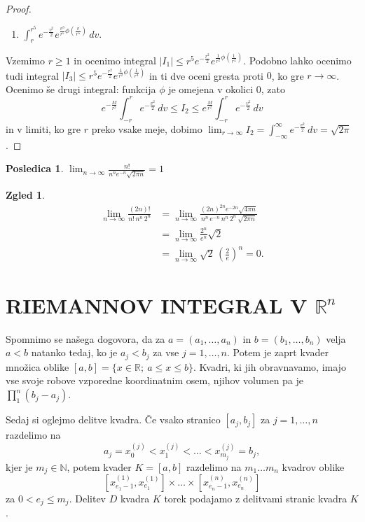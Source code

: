 \documentclass[10pt, a4paper]{article}
\newtheorem{posledica}[izr]{Posledica}
\newtheorem{zgled}{Zgled}[section]
\newenvironment{noticeC}{%
  \tcolorbox[%
  notitle,
  empty,
  enhanced,  %
  breakable,
  coltext=black, 
  fontupper=\rmfamily,
  parbox=false,
  noparskip,
  sharp corners,
  boxrule=-1pt,  %
  frame hidden,
  left=7pt,  %
  right=7pt,
  top=5pt,
  bottom=5pt,
  before skip=2.5ex plus 2pt,
  after skip=2.5ex plus 2pt,
  overlay unbroken and last={%
  },
  ]}
{\endtcolorbox}
\newenvironment{dokaz}%
  {\begin{noticeC}\begin{proof}}%
  {\end{proof}\end{noticeC}}
\newcommand{\N}{\mathbb {N}}
\newcommand{\R}{\mathbb {R}}
\begin{document}
\begin{dokaz}
\begin{enumerate}
        \item $\int_r ^{r^5} e^{-\frac{v^2}{2}} e^{\frac{v^3}{r^5} \phi\left(\frac{v}{r^5}\right)} \, dv$.
    \end{enumerate}
    Vzemimo $r \geq 1$ in ocenimo integral $|I_1| \leq r^5 e^{-\frac{r^2}{2}} e^{\frac{1}{r^2} \phi \left(\frac{1}{r^4}\right)}$.
    Podobno lahko ocenimo tudi integral $|I_3| \leq r^5 e^{-\frac{r^2}{2}} e^{\frac{1}{r^2} \phi \left(\frac{1}{r^4}\right)}$ in
    ti dve oceni gresta proti $0$, ko gre $r \to \infty$.
    Ocenimo še drugi integral: funkcija $\phi$ je omejena v okolici $0$, zato 
    $$e^{-\frac{M}{r^2}} \int_{-r} ^r e^{-\frac{v^2}{2}}\, dv \leq I_2 \leq e^{\frac{M}{r^2}} \int_{-r} ^r e^{-\frac{v^2}{2}}\, dv$$
    in v limiti, ko gre $r$ preko vsake meje, dobimo $\lim_{r \to \infty} I_2 = \int_{-\infty} ^\infty e^{-\frac{v^2}{2}}\, dv = \sqrt{2\pi}$.
\end{dokaz}

\begin{posledica}
    $\lim_{n \to \infty} \frac{n!}{n^n e^{-n} \sqrt{2 \pi n}} = 1$
\end{posledica}

\begin{zgled}
    \begin{align*}
        \lim_{n \to \infty} \frac{(2n)!}{n!\, n^n\, 2^n} &= \lim_{n \to \infty} \frac{(2n)^{2n} e^{-2n} \sqrt{4 \pi n}}{n^n\, e^{-n}\, n^n\, 2^n\, \sqrt{2 \pi n}}\\
        &= \lim_{n \to \infty} \frac{2^n}{e^n} \sqrt{2}\\ 
        &= \lim_{n \to \infty} \sqrt{2}\, \left(\frac{2}{e}\right)^n = 0.
    \end{align*}
\end{zgled}
\clearpage
\section{RIEMANNOV INTEGRAL V $\R^n$}

Spomnimo se našega dogovora, da za $a = (a_1, \dots, a_n)$ in $b = (b_1, \dots, b_n)$
velja $a < b$ natanko tedaj, ko je $a_j < b_j$ za vse $j = 1, \dots, n$.
Potem je zaprt kvader množica oblike $[a, b] = \{x \in \R;\ a \leq x \leq b\}$.
Kvadri, ki jih obravnavamo, imajo vse svoje robove vzporedne koordinatnim osem, njihov volumen pa je 
$\prod_1 ^n (b_j - a_j)$.

Sedaj si oglejmo delitve kvadra.
Če vsako stranico $[a_j, b_j]$ za $j = 1, \dots, n$ razdelimo na 
$$a_j = x_0 ^{(j)} < x_1 ^{(j)} < \dots < x_{m_j} ^{(j)} = b_j,$$
kjer je $m_j \in \N$, potem kvader $K = [a, b]$ razdelimo na $m_1 \dots m_n$ kvadrov oblike 
$$[x_{e_1 - 1} ^{(1)}, x_{e_1}^{(1)}] \times \dots \times [x_{e_n - 1} ^{(n)}, x_{e_n}^{(n)}]$$
za $0 < e_j \leq m_j$. Delitev $D$ kvadra $K$ torek podajamo z delitvami stranic kvadra $K$.
\end{document}

